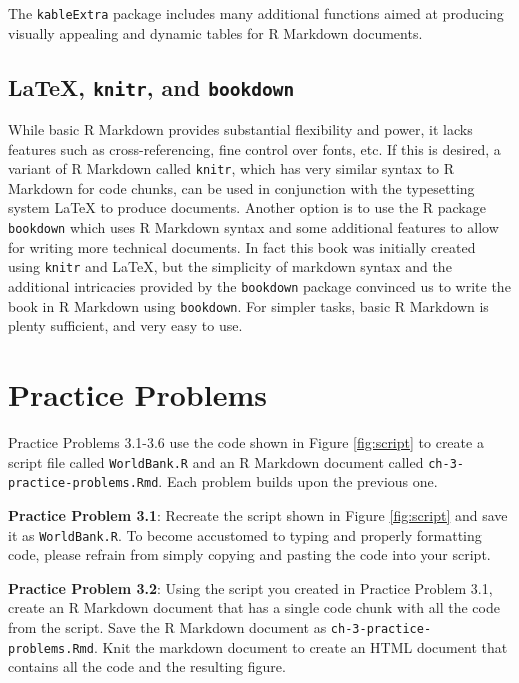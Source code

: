 \documentclass[
]{krantz}
\begin{document}
The \texttt{kableExtra} package includes many additional functions aimed at producing visually appealing and dynamic tables for R Markdown documents.

\hypertarget{latex-knitr-and-bookdown}{%
\subsection{\texorpdfstring{LaTeX, \texttt{knitr}, and \texttt{bookdown}}{LaTeX, knitr, and bookdown}}\label{latex-knitr-and-bookdown}}

While basic R Markdown provides substantial flexibility and power, it lacks features such as cross-referencing, fine control over fonts, etc. If this is desired, a variant of R Markdown called \texttt{knitr}, which has very similar syntax to R Markdown for code chunks, can be used in conjunction with the typesetting system LaTeX to produce documents. Another option is to use the R package \texttt{bookdown} which uses R Markdown syntax and some additional features to allow for writing more technical documents. In fact this book was initially created using \texttt{knitr} and LaTeX, but the simplicity of markdown syntax and the additional intricacies provided by the \texttt{bookdown} package convinced us to write the book in R Markdown using \texttt{bookdown}. For simpler tasks, basic R Markdown is plenty sufficient, and very easy to use.

\hypertarget{practiceProblemsRMarkdown}{%
\section{Practice Problems}\label{practiceProblemsRMarkdown}}

Practice Problems 3.1-3.6 use the code shown in Figure \ref{fig:script} to create a script file called \texttt{WorldBank.R} and an R Markdown document called \texttt{ch-3-practice-problems.Rmd}. Each problem builds upon the previous one.

\textbf{Practice Problem 3.1}: Recreate the script shown in Figure \ref{fig:script} and save it as \texttt{WorldBank.R}. To become accustomed to typing and properly formatting code, please refrain from simply copying and pasting the code into your script.

\textbf{Practice Problem 3.2}: Using the script you created in Practice Problem 3.1, create an R Markdown document that has a single code chunk with all the code from the script. Save the R Markdown document as \texttt{ch-3-practice-problems.Rmd}. Knit the markdown document to create an HTML document that contains all the code and the resulting figure.
\end{document}
